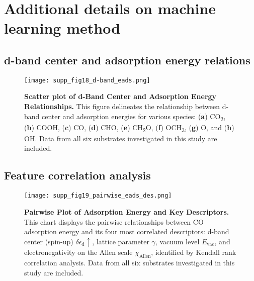 
\section{Additional details on machine learning method}

\subsection{d-band center and adsorption energy relations}
\label{supp_sec3.1_dband_eads}

\begin{figure}[htbp]
  \centering
  \texttt{[image: supp\_fig18\_d-band\_eads.png]}
  \caption{\textbf{Scatter plot of d-Band Center and Adsorption Energy Relationships.}
  This figure delineates the relationship between d-band center and adsorption energies for
  various species: (\textbf{a}) CO\textsubscript{2}, (\textbf{b}) COOH, (\textbf{c}) CO,
  (\textbf{d}) CHO, (\textbf{e}) CH\textsubscript{2}O, (\textbf{f}) OCH\textsubscript{3},
  (\textbf{g}) O, and (\textbf{h}) OH.
  Data from all six substrates investigated in this study are included.}
  \label{supp_fig18:dband_vs_eads}
\end{figure}

\subsection{Feature correlation analysis}
\label{supp_sec3.2_feature_corr}

\begin{figure}[htbp]
  \centering
  \texttt{[image: supp\_fig19\_pairwise\_eads\_des.png]}
  \caption{\textbf{Pairwise Plot of Adsorption Energy and Key Descriptors.}
  This chart displays the pairwise relationships between CO adsorption energy and
  its four most correlated descriptors: d-band center (spin-up) $\delta\epsilon_{\text{d}}\uparrow$,
  lattice parameter $\gamma$, vacuum level $E_\text{vac}$, and electronegativity
  on the Allen scale $\chi_\text{Allen}$, identified by Kendall rank correlation analysis.
  Data from all six substrates investigated in this study are included.}
  \label{supp_fig19:pairwise_eads_des}
\end{figure}

